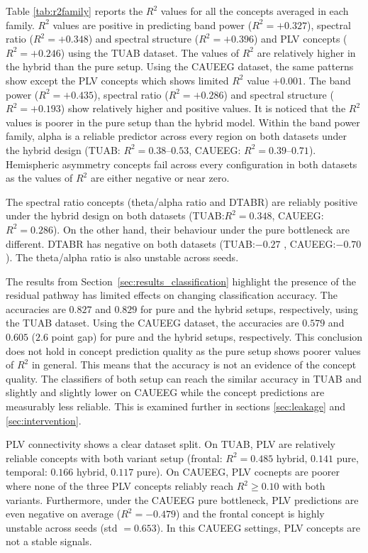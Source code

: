 \documentclass[journal,twoside,web]{ieeecolor}
\begin{document}
Table \ref{tab:r2family} reports the $R^2$ values for all the concepts averaged in each family. $R^2$ values are positive in predicting band power ($R^2=+0.327$), spectral ratio ($R^2=+0.348$) and spectral structure ($R^2=+0.396$) and PLV concepts ($R^2=+0.246$) using the TUAB dataset. The values of $R^2$ are relatively higher in the hybrid than the pure setup. Using the CAUEEG dataset, the same patterns show except the PLV concepts which shows limited $R^2$ value $+0.001$. The band power ($R^2=+0.435$), spectral ratio ($R^2=+0.286$) and spectral structure ($R^2=+0.193$) show relatively higher and positive values. It is noticed that the $R^2$ values is poorer in the pure setup than the hybrid model. Within the band power family, alpha is a reliable predictor across every region on both datasets under the hybrid design (TUAB: $R^2=0.38$--$0.53$, CAUEEG: $R^2=0.39$--$0.71$). Hemispheric asymmetry concepts fail across every configuration in both datasets as the values of  $R^2$ are either negative or near zero. 

The spectral ratio concepts (theta/alpha ratio and DTABR) are reliably positive under the hybrid design on both datasets (TUAB:$R^2=0.348$, CAUEEG:$R^2=0.286$). On the other hand, their behaviour under the pure bottleneck are different. DTABR has negative on both datasets (TUAB:$-0.27$ , CAUEEG:$-0.70$). The theta/alpha ratio is also unstable across seeds.

The results from Section~\ref{sec:results_classification} highlight the presence of the residual pathway has limited effects on changing classification accuracy. The accuracies are $0.827$ and $0.829$ for pure and  the hybrid setups, respectively, using the TUAB dataset. Using the CAUEEG dataset, the accuracies are $0.579$ and $0.605$ ($2.6$ point gap) for pure and the hybrid setups, respectively. This conclusion does not hold in concept prediction quality as the pure setup shows poorer values of $R^2$ in general. This means that the accuracy is not an evidence of the concept quality. The classifiers of both setup can reach the similar accuracy in TUAB and slightly and slightly lower on CAUEEG while the concept predictions are measurably less reliable. This is examined further in sections \ref{sec:leakage} and  \ref{sec:intervention}.

PLV connectivity shows a clear dataset split. On TUAB, PLV are relatively reliable concepts with both variant setup (frontal: $R^2=0.485$ hybrid, $0.141$ pure, temporal: $0.166$ hybrid, $0.117$ pure). On CAUEEG, PLV cocnepts are poorer where none of the three PLV concepts reliably reach $R^2 \geq 0.10$ with both variants. Furthermore, under the CAUEEG pure bottleneck, PLV predictions are even negative on average ($R^2=-0.479$) and the frontal concept is highly unstable across seeds (std $=0.653$). In this CAUEEG settings, PLV concepts are not a stable signals.
\end{document}

